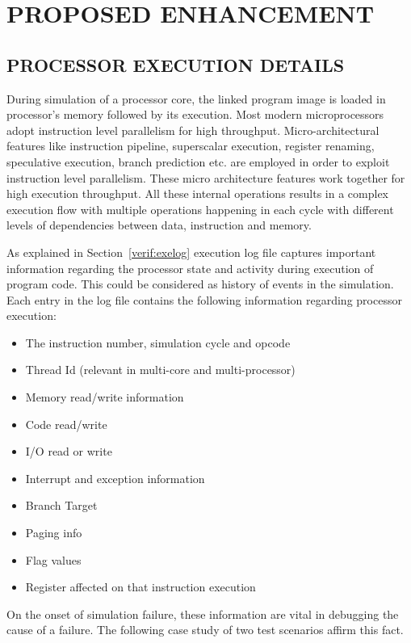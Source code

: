 \chapter{PROPOSED ENHANCEMENT}
\label{chap:enhancement.tex}

\section {PROCESSOR EXECUTION DETAILS}

During simulation of a processor core, the linked program image is loaded in processor's memory followed by its execution. Most modern microprocessors adopt instruction level parallelism for high throughput. Micro-architectural features like instruction pipeline, superscalar execution, register renaming, speculative execution, branch prediction etc. are employed in order to exploit instruction level parallelism.  These micro architecture features work together for high execution throughput. All these internal operations results in a complex execution flow with multiple operations happening in each cycle with different levels of dependencies between data, instruction and memory.


As explained in Section~\ref{verif:exelog} execution log file captures important information regarding the processor state and activity during execution of program code. This could be considered as history of events in the simulation. Each entry in the log file contains the following information regarding processor execution:
\begin{itemize}
	\item The instruction number, simulation cycle and opcode
	\item Thread Id (relevant in multi-core and multi-processor)
	\item Memory read/write information
	\item Code read/write
	\item I/O read or write
	\item Interrupt and exception information
	\item Branch Target
	\item Paging info
	\item Flag values
	\item Register affected on that instruction execution
\end{itemize}
On the onset of simulation failure, these information are vital in debugging the cause of a failure. The following case study of two test scenarios affirm this fact.

